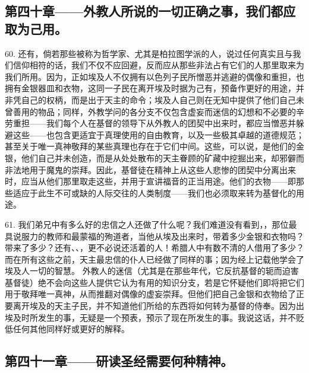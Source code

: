 
\subsection{第四十章——外教人所说的一切正确之事，我们都应取为己用。}

60. 还有，倘若那些被称为哲学家、尤其是柏拉图学派的人，说过任何真实且与我们信仰相符的话，我们不仅不应回避，反而应从那些非法占有它们的人那里取来为我们所用。因为，正如埃及人不仅拥有以色列子民所憎恶并逃避的偶像和重担，也拥有金银器皿和衣物，这同一子民在离开埃及时据为己有，预备作更好的用途，并非凭自己的权柄，而是出于天主的命令；埃及人自己则在无知中提供了他们自己未曾善用的物品；同样，外教学问的各分支不仅包含虚妄而迷信的幻想和不必要的辛劳重担——我们每个人在基督的领导下从外教人的团契中出来时，都应当憎恶并躲避这些——也包含更适宜于真理使用的自由教育，以及一些极其卓越的道德规范；甚至关于唯一真神敬拜的某些真理也存在于它们中间。这些，可以说，是他们的金银，他们自己并未创造，而是从处处散布的天主眷顾的矿藏中挖掘出来，却邪僻而非法地用于魔鬼的崇拜。因此，基督徒在精神上从这些人悲惨的团契中分离出来时，应当从他们那里取走这些，并用于宣讲福音的正当用途。他们的衣物——即那些适应于此生不可或缺的人际交往的人类制度——我们也必须取来转为基督化的用途。\par

61. 我们弟兄中有多么好的忠信之人还做了什么呢？我们难道没有看到，，那位最具说服力的教师和最蒙福的殉道者，当他从埃及出来时，带着多少金银和衣物吗？带来了多少？还有、、，更不必说还活着的人！希腊人中有数不清的人借用了多少？而在所有这些之前，天主最忠信的仆人已经做了同样的事；因为经上记载他学会了埃及人一切的智慧。 外教人的迷信（尤其是在那些年代，它反抗基督的轭而迫害基督徒）绝不会向这些人提供它认为有用的知识分支，若是它怀疑他们即将把它们用于敬拜唯一真神，从而推翻对偶像的虚妄崇拜。但他们把自己金银和衣物给了正要离开埃及的天主子民，并不知道他们所给的东西将如何转为基督的侍奉。因为出埃及时所发生的事，无疑是一个预表，预示了现在所发生的事。我说这话，并不贬低任何其他同样好或更好的解释。\par


\subsection{第四十一章——研读圣经需要何种精神。}

